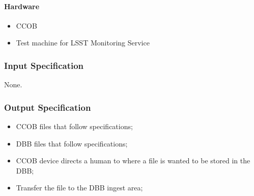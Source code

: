 \paragraph{Hardware}
\begin{itemize}
\tightlist
\item
  CCOB
\item
  Test machine for LSST Monitoring Service
\end{itemize}


\subsubsection{Input Specification}
None.


\subsubsection{Output Specification}
\begin{itemize}
\tightlist
\item
  CCOB files that follow specifications;
\item
  DBB files that follow specifications;
\item
  CCOB device directs a human to where a file is wanted to be stored in
  the DBB;
\item
  Transfer the file to the DBB ingest area;
\end{itemize}


